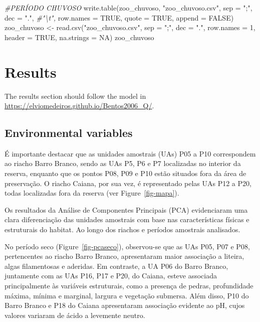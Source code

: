 \documentclass[
  letterpaper,
  DIV=11,
  numbers=noendperiod]{scrartcl}
\newenvironment{Shaded}{}{}
\newcommand{\AttributeTok}[1]{\textcolor[rgb]{0.49,0.56,0.16}{#1}}
\newcommand{\CommentTok}[1]{\textcolor[rgb]{0.38,0.63,0.69}{\textit{#1}}}
\newcommand{\ConstantTok}[1]{\textcolor[rgb]{0.53,0.00,0.00}{#1}}
\newcommand{\DecValTok}[1]{\textcolor[rgb]{0.25,0.63,0.44}{#1}}
\newcommand{\FunctionTok}[1]{\textcolor[rgb]{0.02,0.16,0.49}{#1}}
\newcommand{\NormalTok}[1]{#1}
\newcommand{\OtherTok}[1]{\textcolor[rgb]{0.00,0.44,0.13}{#1}}
\newcommand{\StringTok}[1]{\textcolor[rgb]{0.25,0.44,0.63}{#1}}
\begin{document}
\begin{Shaded}
\begin{Highlighting}[numbers=left,,]
\CommentTok{\#PERÍODO CHUVOSO}
\FunctionTok{write.table}\NormalTok{(zoo\_chuvoso, }\StringTok{"zoo\_chuvoso.csv"}\NormalTok{,}
            \AttributeTok{sep =} \StringTok{";"}\NormalTok{, }\AttributeTok{dec =} \StringTok{"."}\NormalTok{, }\CommentTok{\#"\textbackslash{}t",}
            \AttributeTok{row.names =} \ConstantTok{TRUE}\NormalTok{,}
            \AttributeTok{quote =} \ConstantTok{TRUE}\NormalTok{,}
            \AttributeTok{append =} \ConstantTok{FALSE}\NormalTok{)}
\NormalTok{zoo\_chuvoso }\OtherTok{\textless{}{-}} \FunctionTok{read.csv}\NormalTok{(}\StringTok{"zoo\_chuvoso.csv"}\NormalTok{,}
                     \AttributeTok{sep =} \StringTok{";"}\NormalTok{, }\AttributeTok{dec =} \StringTok{"."}\NormalTok{,}
                     \AttributeTok{row.names =} \DecValTok{1}\NormalTok{,}
                     \AttributeTok{header =} \ConstantTok{TRUE}\NormalTok{,}
                     \AttributeTok{na.strings =} \ConstantTok{NA}\NormalTok{)}
\NormalTok{zoo\_chuvoso}
\end{Highlighting}
\end{Shaded}

\section{Results}\label{results}

The results section should follow the model in
\url{https://elviomedeiros.github.io/Bentos2006_Q/}.

\subsection{Environmental variables}\label{environmental-variables}

É importante destacar que as unidades amostrais (UAs) P05 a P10
correspondem ao riacho Barro Branco, sendo as UAs P5, P6 e P7
localizadas no interior da reserva, enquanto que os pontos P08, P09 e
P10 estão situados fora da área de preservação. O riacho Caiana, por sua
vez, é representado pelas UAs P12 a P20, todas localizadas fora da
reserva (ver Figure~\ref{fig-mapa}).

Os resultados da Análise de Componentes Principais (PCA) evidenciaram
uma clara diferenciação das unidades amostrais com base nas
características físicas e estruturais do habitat. Ao longo dos riachos e
períodos amostrais analisados.

No período seco (Figure~\ref{fig-pcaseco}), observou-se que as UAs P05,
P07 e P08, pertencentes ao riacho Barro Branco, apresentaram maior
associação a liteira, algas filamentosas e aderidas. Em contraste, a UA
P06 do Barro Branco, juntamente com as UAs P16, P17 e P20, do Caiana,
esteve associada principalmente às variáveis estruturais, como a
presença de pedras, profundidade máxima, mínima e marginal, largura e
vegetação submersa. Além disso, P10 do Barro Branco e P18 do Caiana
apresentaram associação evidente ao pH, cujos valores variaram de ácido
a levemente neutro.
\end{document}
